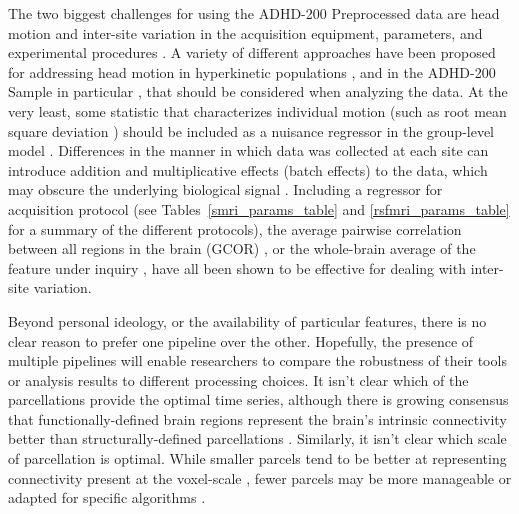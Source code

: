 \documentclass[preprint,12pt,3p]{elsarticle}
\begin{document}
The two biggest challenges for using the ADHD-200 Preprocessed data are head motion \cite{power2012, vandijk2012, sattertwhaite2012, fair2012adhd200, yan2013motion, yan2013small} and inter-site variation in the acquisition equipment, parameters, and experimental procedures \cite{Olivetti2012,yan2013std}. A variety of different approaches have been proposed for addressing head motion in hyperkinetic populations \cite{power2012, sattertwhaite2013}, and in the ADHD-200 Sample in particular \cite{fair2012adhd200}, that should be considered when analyzing the data. At the very least, some statistic that characterizes individual motion (such as root mean square deviation \cite{JenkinsonTR99}) should be included as a nuisance regressor in the group-level model \cite{sattertwhaite2012, yan2013motion}. Differences in the manner in which data was collected at each site can introduce addition and multiplicative effects (batch effects) to the data, which may obscure the underlying biological signal \cite{Olivetti2012,yan2013std}. Including a regressor for acquisition protocol (see Tables~\ref{smri_params_table} and \ref{rsfmri_params_table} for a summary of the different protocols), the average pairwise correlation between all regions in the brain (GCOR) \cite{saad2013gcor}, or the whole-brain average of the feature under inquiry \cite{yan2013std}, have all been shown to be effective for dealing with inter-site variation. 

Beyond personal ideology, or the availability of particular features, there is no clear reason to prefer one pipeline over the other. Hopefully, the presence of multiple pipelines will enable researchers to compare the robustness of their tools or analysis results to different processing choices. It isn't clear which of the parcellations provide the optimal time series, although there is growing consensus that functionally-defined brain regions represent the brain's intrinsic connectivity better than structurally-defined parcellations \cite{craddock2012whole, Blumensath2013, thirion2014}. Similarly, it isn't clear which scale of parcellation is optimal. While smaller parcels tend to be better at representing connectivity present at the voxel-scale \cite{bellec2006identification, craddock2012whole, thirion2014}, fewer parcels may be more manageable or adapted for specific algorithms \cite[e.g.]{michel2012supervised,bellec2015impact}. 
\end{document}
